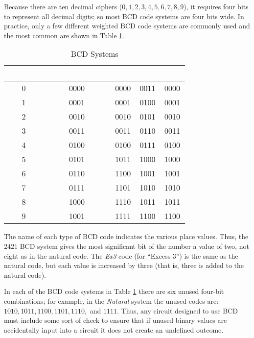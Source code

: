 Because there are ten decimal ciphers ($ 0, 1, 2, 3, 4, 5, 6, 7, 8, 9 $), it requires four bits to represent all decimal digits; so most \ac{BCD} code systems are four bits wide. In practice, only a few different weighted \ac{BCD} code systems are commonly used and the most common are shown in Table \ref{MO:tab:bcd_systems}. 

\begin{table}[H]
  \sffamily
  \newcommand{\head}[1]{\textcolor{white}{\textbf{#1}}}    
  \begin{center}
    \begin{tabular}{ c c c c c } 
      \hline
      \rowcolor{black!75}
      {\head{Decimal}} & {\head{8421 (Natural)}} & \head{2421} 
      & \head{Ex3} & \head{5421} \\
      \hline    
      0 & 0000 & 0000 & 0011 & 0000 \\
      1 & 0001 & 0001 & 0100 & 0001 \\
      2 & 0010 & 0010 & 0101 & 0010 \\
      3 & 0011 & 0011 & 0110 & 0011 \\
      4 & 0100 & 0100 & 0111 & 0100 \\
      5 & 0101 & 1011 & 1000 & 1000 \\
      6 & 0110 & 1100 & 1001 & 1001 \\
      7 & 0111 & 1101 & 1010 & 1010 \\
      8 & 1000 & 1110 & 1011 & 1011 \\
      9 & 1001 & 1111 & 1100 & 1100 \\
      \hline  
    \end{tabular}
  \end{center}
  \caption{BCD Systems}
  \label{MO:tab:bcd_systems}
\end{table}

The name of each type of \ac{BCD} code indicates the various place values. Thus, the $ 2421 $ \ac{BCD} system gives the most significant bit of the number a value of two, not eight as in the natural code. The \emph{Ex3} code (for ``Excess 3'') is the same as the natural code, but each value is increased by three (that is, three is added to the natural code). 

In each of the \ac{BCD} code systems in Table \ref{MO:tab:bcd_systems} there are six unused four-bit combinations; for example, in the \emph{Natural} system the unused codes are: $ 1010, 1011, 1100, 1101, 1110, $ and $ 1111 $. Thus, any circuit designed to use \ac{BCD} must include some sort of check to ensure that if unused binary values are accidentally input into a circuit it does not create an undefined outcome.

